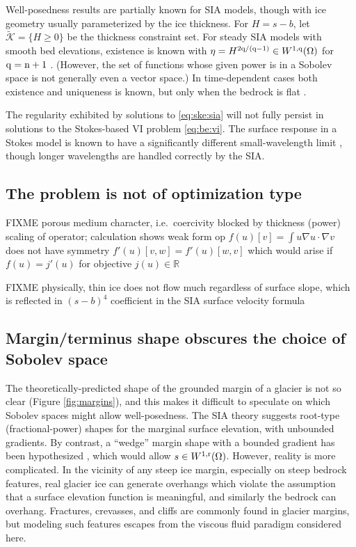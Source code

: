 \documentclass[hidelinks,onefignum,onetabnum,final]{siamart220329}  %
\newcommand{\RR}{\mathbb{R}}
\newcommand{\grad}{\nabla}
\newcommand{\cK}{\mathcal{K}}
\newcommand{\nn}{{\text{\textnormal{n}}}}
\newcommand{\qq}{{\text{\textnormal{q}}}}
\newcommand{\rr}{{\text{\textnormal{r}}}}
\begin{document}
Well-posedness results are partially known for SIA models, though with ice geometry usually parameterized by the ice thickness.  For $H=s-b$, let $\tilde{\cK} = \{H\ge 0\}$ be the thickness constraint set.   For steady SIA models with smooth bed elevations, existence is known with $\eta = H^{2\qq/(\qq-1)} \in W^{1,\qq}(\Omega)$ for $\qq=\nn+1$ \cite{JouvetBueler2012}.  (However, the set of functions whose given power is in a Sobolev space is not generally even a vector space.)  In time-dependent cases both existence and uniqueness is known, but only when the bedrock is flat \cite{Calvoetal2003,PiersantiTemam2023}.

The regularity exhibited by solutions to \eqref{eq:ske:sia} will not fully persist in solutions to the Stokes-based VI problem \eqref{eq:be:vi}.  The surface response in a Stokes model is known to have a significantly different small-wavelength limit \cite{Pattynetal2008}, though longer wavelengths are handled correctly by the SIA.

\subsection{The problem is not of optimization type} \label{subsec:notopt}  FIXME porous medium character, i.e.~coercivity blocked by thickness (power) scaling of operator; calculation shows weak form op $f(u)[v] = \int u \grad u\cdot \grad v$ does not have symmetry $f'(u)[v,w] = f'(u)[w,v]$ which would arise if $f(u)=j'(u)$ for objective $j(u) \in \RR$

FIXME physically, thin ice does not flow much regardless of surface slope, which is reflected in $(s-b)^4$ coefficient in the SIA surface velocity formula

\subsection{Margin/terminus shape obscures the choice of Sobolev space} \label{subsec:margin}  The theoretically-predicted shape of the grounded margin of a glacier is not so clear (Figure \ref{fig:margins}), and this makes it difficult to speculate on which Sobolev spaces might allow well-posedness.  The SIA theory suggests root-type (fractional-power) shapes \cite{Bueleretal2005} for the marginal surface elevation, with unbounded gradients.  By contrast, a ``wedge'' margin shape with a bounded gradient has been hypothesized \cite[for example]{EchelmeyerKamb1986}, which would allow $s\in W^{1,\rr}(\Omega)$.  However, reality is more complicated.  In the vicinity of any steep ice margin, especially on steep bedrock features, real glacier ice can generate overhangs which violate the assumption that a surface elevation function is meaningful, and similarly the bedrock can overhang.  Fractures, crevasses, and cliffs are commonly found in glacier margins, but modeling such features escapes from the viscous fluid paradigm considered here.
\end{document}
